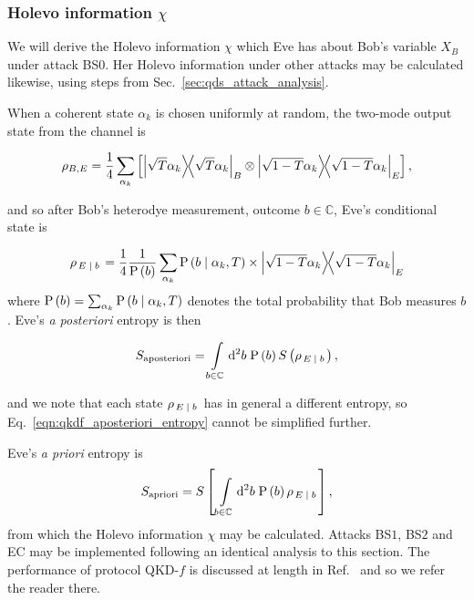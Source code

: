 \subsubsection{Holevo information $\chi$}
We will derive the Holevo information $\chi$ which Eve has about Bob's variable $X_B$ under attack BS$0$. Her Holevo information under other attacks may be calculated likewise, using steps from Sec.~\ref{sec:qds_attack_analysis}.

When a coherent state $\alpha_k$ is chosen uniformly at random, the two-mode output state from the channel is

\begin{equation}
\rho_{B, E} = \frac{1}{4} \sum_{\alpha_k} \left[ \dyad{\sqrt{T}\alpha_k}_B \otimes \dyad{\sqrt{1-T}\alpha_k}_E\right],
\end{equation}

\noindent and so after Bob's heterodye measurement, outcome $b \in \mathbb{C}$, Eve's conditional state is

\begin{equation}\label{eqn:qkdf_eve_conditional}
\rho_{\left. E \given b\right.} = \frac{1}{4} \frac{1}{\text{P}\left(b\right)} \sum_{\alpha_k} \text{P}\left(b \given \alpha_k, T\right) \times \dyad{\sqrt{1-T}\alpha_k}_E
\end{equation}
where $\text{P}\left(b\right) = \sum_{\alpha_k}\text{P}\left(b \; \middle| \; \alpha_k, T\right)$ denotes the total probability that Bob measures $b$. Eve's \emph{a posteriori} entropy is then

\begin{equation}\label{eqn:qkdf_aposteriori_entropy}
S_{\text{aposteriori}} = \int\limits_{b \in \mathbb{C}} \mathop{}\!\mathrm{d^2} b \; \text{P}\left(b\right) S\left(\rho_{\left. E \; \middle| \; b \right.}\right),
\end{equation}

\noindent and we note that each state $\rho_{\left.E\; \middle| \; b \right.}$ has in general a different entropy, so Eq.~\ref{eqn:qkdf_aposteriori_entropy} cannot be simplified further. 

Eve's \emph{a priori} entropy is
\begin{equation}\label{eqn:qkdf_apriori_entropy}
S_{\text{apriori}} = S\left[\, \int\limits_{b \in \mathbb{C}} \mathop{}\!\mathrm{d^2} b \; \text{P}\left(b\right) \rho_{\left. E \; \middle| \; b \right.}\right],
\end{equation}
from which the Holevo information $\chi$ may be calculated. Attacks BS$1$, BS$2$ and EC may be implemented following an identical analysis to this section. The performance of protocol QKD-$f$ is discussed at length in Ref.~\cite{Papanastasiou2018} and so we refer the reader there. 



